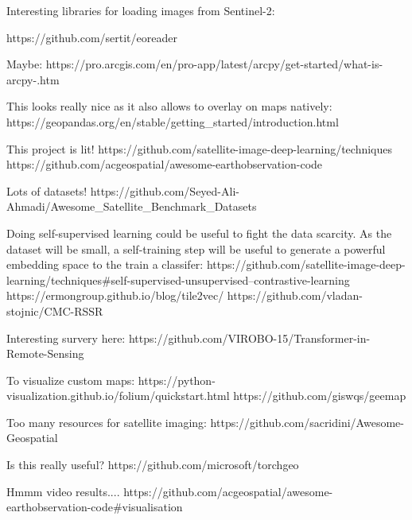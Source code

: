 

Interesting libraries for loading images from Sentinel-2:

https://github.com/sertit/eoreader


Maybe:
https://pro.arcgis.com/en/pro-app/latest/arcpy/get-started/what-is-arcpy-.htm

This looks really nice as it also allows to overlay on maps natively:
https://geopandas.org/en/stable/getting_started/introduction.html

This project is lit!
https://github.com/satellite-image-deep-learning/techniques
https://github.com/acgeospatial/awesome-earthobservation-code

Lots of datasets!
https://github.com/Seyed-Ali-Ahmadi/Awesome_Satellite_Benchmark_Datasets

Doing self-supervised learning could be useful to fight the data scarcity.
As the dataset will be small, a self-training step will be useful to generate
a powerful embedding space to the train a classifer:
https://github.com/satellite-image-deep-learning/techniques#self-supervised-unsupervised--contrastive-learning
https://ermongroup.github.io/blog/tile2vec/
https://github.com/vladan-stojnic/CMC-RSSR


Interesting survery here:
https://github.com/VIROBO-15/Transformer-in-Remote-Sensing


To visualize custom maps:
https://python-visualization.github.io/folium/quickstart.html
https://github.com/giswqs/geemap



Too many resources for satellite imaging:
https://github.com/sacridini/Awesome-Geospatial


Is this really useful?
https://github.com/microsoft/torchgeo




Hmmm video results....
https://github.com/acgeospatial/awesome-earthobservation-code#visualisation